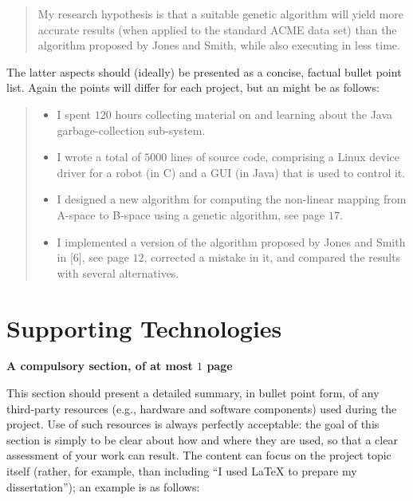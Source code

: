\documentclass[
author={Veyndan Stuart},
supervisor={Prof. Dave Cliff},
degree={MEng},
title={Some Structural Guidelines for CS MEng Dissertations},
subtitle={},
type={enterprise},
year={2019}
]{thesis}
\begin{document}
    \begin{quote}
        My research hypothesis is that a suitable genetic algorithm will yield
        more accurate results (when applied to the standard ACME data set) than
        the algorithm proposed by Jones and Smith, while also executing in less
        time.
    \end{quote}

    \noindent
    The latter aspects should (ideally) be presented as a concise, factual
    bullet point list. Again the points will differ for each project, but
    an might be as follows:

    \begin{quote}
        \noindent
        \begin{itemize}
            \item I spent $120$ hours collecting material on and learning about the
            Java garbage-collection sub-system.
            \item I wrote a total of $5000$ lines of source code, comprising a Linux
            device driver for a robot (in C) and a GUI (in Java) that is
            used to control it.
            \item I designed a new algorithm for computing the non-linear mapping
            from A-space to B-space using a genetic algorithm, see page $17$.
            \item I implemented a version of the algorithm proposed by Jones and
            Smith in [6], see page $12$, corrected a mistake in it, and
            compared the results with several alternatives.
        \end{itemize}
    \end{quote}


    \chapter*{Supporting Technologies}

    {\bf A compulsory section, of at most $1$ page}
    \vspace{1cm}

    \noindent
    This section should present a detailed summary, in bullet point form,
    of any third-party resources (e.g., hardware and software components)
    used during the project. Use of such resources is always perfectly
    acceptable: the goal of this section is simply to be clear about how
    and where they are used, so that a clear assessment of your work can
    result. The content can focus on the project topic itself (rather,
    for example, than including ``I used \mbox{\LaTeX} to prepare my
    dissertation''); an example is as follows:
\end{document}
